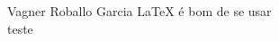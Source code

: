 \documentclass[article,12pt,a4paper]{abntex2}
\begin{document}
Vagner Roballo Garcia \LaTeX{} é bom de se usar \\

teste
\end{document}
